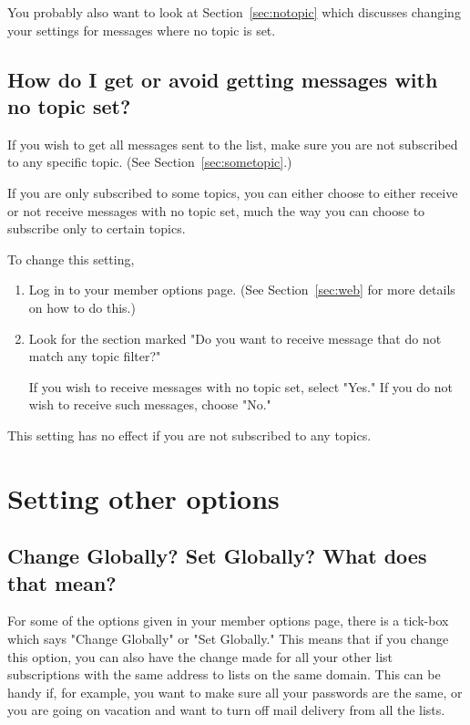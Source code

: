 \documentclass{howto}
\begin{document}
You probably also want to look at Section~\ref{sec:notopic} which discusses
changing your settings for messages where no topic is set.

\subsection{How do I get or avoid getting messages with no topic set?
\label{sec:notopic}}
If you wish to get all messages sent to the list, make sure you are 
not subscribed to any specific topic.  (See Section~\ref{sec:sometopic}.)  

If you are only subscribed to some topics, you can either choose to either
receive or not receive messages with no topic set, much the way you can 
choose to subscribe only to certain topics.

To change this setting,
\begin{enumerate}
	\item Log in to your member options page.  (See Section~\ref{sec:web} 
	for more details on how to do this.)
	\item Look for the section marked "Do you want to receive message that do 
	not match any topic filter?"

	If you wish to receive messages with no topic set, select "Yes."  If you
	do not wish to receive such messages, choose "No."
\end{enumerate}

This setting has no effect if you are not subscribed to any topics.

\section{Setting other options}

\subsection{Change Globally?  Set Globally? What does that mean?
	\label{sec:global}}

For some of the options given in your member options page, there is a 
tick-box which says "Change Globally" or "Set Globally."  
This means that if you change this
option, you can also have the change made for all your other list 
subscriptions with the same address to lists on the same domain.  
This can be handy if, for example, you 
want to make sure all your passwords are the same, or you are going on 
vacation and want to turn off mail delivery from all the lists.
\end{document}

